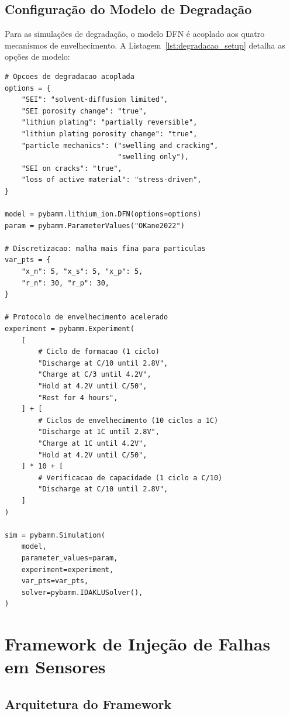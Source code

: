 \documentclass[
    12pt,
    openright,
    twoside,
    a4paper,
    brazil,
    english
]{abntex2}
\begin{document}
\subsection{Configuração do Modelo de Degradação}

Para as simulações de degradação, o modelo DFN é acoplado aos quatro
mecanismos de envelhecimento. A Listagem~\ref{lst:degradacao_setup}
detalha as opções de modelo:

\begin{lstlisting}[caption={Configuração do DFN com mecanismos acoplados de degradação (OKane2022).},
                   label={lst:degradacao_setup}]
# Opcoes de degradacao acoplada
options = {
    "SEI": "solvent-diffusion limited",
    "SEI porosity change": "true",
    "lithium plating": "partially reversible",
    "lithium plating porosity change": "true",
    "particle mechanics": ("swelling and cracking",
                           "swelling only"),
    "SEI on cracks": "true",
    "loss of active material": "stress-driven",
}

model = pybamm.lithium_ion.DFN(options=options)
param = pybamm.ParameterValues("OKane2022")

# Discretizacao: malha mais fina para particulas
var_pts = {
    "x_n": 5, "x_s": 5, "x_p": 5,
    "r_n": 30, "r_p": 30,
}

# Protocolo de envelhecimento acelerado
experiment = pybamm.Experiment(
    [
        # Ciclo de formacao (1 ciclo)
        "Discharge at C/10 until 2.8V",
        "Charge at C/3 until 4.2V",
        "Hold at 4.2V until C/50",
        "Rest for 4 hours",
    ] + [
        # Ciclos de envelhecimento (10 ciclos a 1C)
        "Discharge at 1C until 2.8V",
        "Charge at 1C until 4.2V",
        "Hold at 4.2V until C/50",
    ] * 10 + [
        # Verificacao de capacidade (1 ciclo a C/10)
        "Discharge at C/10 until 2.8V",
    ]
)

sim = pybamm.Simulation(
    model,
    parameter_values=param,
    experiment=experiment,
    var_pts=var_pts,
    solver=pybamm.IDAKLUSolver(),
)
\end{lstlisting}

\section{Framework de Injeção de Falhas em Sensores}

\subsection{Arquitetura do Framework}
\end{document}
